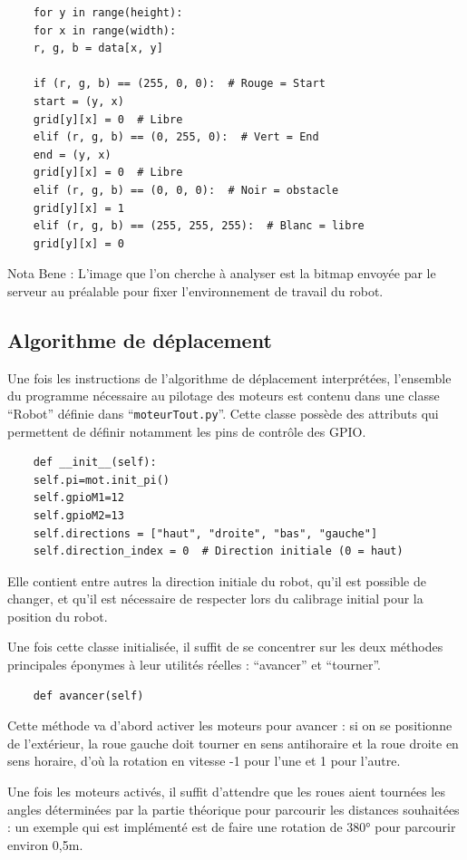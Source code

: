 \documentclass[a4paper,12pt]{report}  %
\begin{document}
\begin{lstlisting}
	for y in range(height):
	for x in range(width):
	r, g, b = data[x, y]
	
	if (r, g, b) == (255, 0, 0):  # Rouge = Start
	start = (y, x)
	grid[y][x] = 0  # Libre
	elif (r, g, b) == (0, 255, 0):  # Vert = End
	end = (y, x)
	grid[y][x] = 0  # Libre
	elif (r, g, b) == (0, 0, 0):  # Noir = obstacle
	grid[y][x] = 1
	elif (r, g, b) == (255, 255, 255):  # Blanc = libre
	grid[y][x] = 0
\end{lstlisting}


Nota Bene : L’image que l’on cherche à analyser est la bitmap envoyée par le serveur au préalable pour fixer l’environnement de travail du robot.

\subsection{Algorithme de déplacement}

Une fois les instructions de l’algorithme de déplacement interprétées, l’ensemble du programme nécessaire au pilotage des moteurs est contenu dans une classe “Robot” définie dans “\texttt{moteurTout.py}”. Cette classe possède des attributs qui permettent de définir notamment les pins de contrôle des GPIO.

\begin{lstlisting}
	def __init__(self):
	self.pi=mot.init_pi()
	self.gpioM1=12
	self.gpioM2=13
	self.directions = ["haut", "droite", "bas", "gauche"]
	self.direction_index = 0  # Direction initiale (0 = haut)
\end{lstlisting}

Elle contient entre autres la direction initiale du robot, qu’il est possible de changer, et qu’il est nécessaire de respecter lors du calibrage initial pour la position du robot.

Une fois cette classe initialisée, il suffit de se concentrer sur les deux méthodes principales éponymes à leur utilités réelles : “avancer” et “tourner”.

\begin{lstlisting}
	def avancer(self)
\end{lstlisting}

Cette méthode va d’abord activer les moteurs pour avancer : si on se positionne de l’extérieur, la roue gauche doit tourner en sens antihoraire et la roue droite en sens horaire, d’où la rotation en vitesse -1 pour l’une et 1 pour l’autre.

Une fois les moteurs activés, il suffit d’attendre que les roues aient tournées les angles déterminées par la partie théorique pour parcourir les distances souhaitées : un exemple qui est implémenté est de faire une rotation de 380° pour parcourir environ 0,5m.
\end{document}
